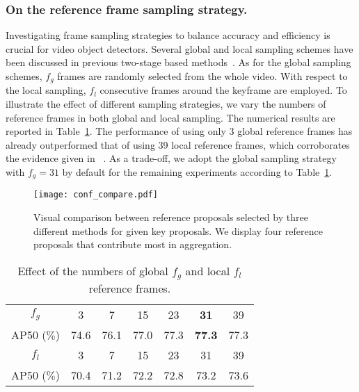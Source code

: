 \documentclass[letterpaper]{article} \usepackage{aaai23}  \usepackage{times}  \usepackage{helvet}  \usepackage{courier}  \usepackage[hyphens]{url}  \usepackage{graphicx} \urlstyle{rm} \def\UrlFont{\rm}  \usepackage{natbib}  \usepackage{caption} \usepackage{xcolor}
\begin{document}
\subsubsection{On the reference frame sampling strategy.} Investigating frame sampling strategies to balance accuracy and efficiency is crucial for video object detectors. Several global and local sampling schemes have been discussed in previous two-stage based methods~\cite{wu2019sequence,gong2021temporal,chen2020memory}. As for the global sampling schemes, $f_g$ frames are randomly selected from the whole video. With respect to the local sampling, $f_l$ consecutive frames around the keyframe are employed. To illustrate the effect of different sampling strategies, we vary the numbers of reference frames in both global and local sampling. The numerical results are reported in Table~\ref{table:effectiveness of local and global number}. The performance of using only 3 global reference frames has already outperformed that of using 39 local reference frames, which corroborates the evidence given in ~\cite{wu2019sequence,gong2021temporal}. As a trade-off, we adopt the global sampling strategy with $f_g= 31$ by default for the remaining experiments according to Table~\ref{table:effectiveness of local and global number}. 

\begin{figure*}[t]
\centering
\texttt{[image: conf\_compare.pdf]}
\caption{Visual comparison between reference proposals selected by three different methods for given key proposals. We display four reference proposals that contribute most in aggregation.}
\vspace{1mm}
\label{fig:conf compare}
\end{figure*}

\setlength{\tabcolsep}{4pt}

\begin{table}[t]
\begin{center}
\begin{tabular}{c|cccccc}
\hline\noalign{\smallskip}
$f_g$ & 3 & 7 & 15 & 23 & \textbf{31} & 39\\
\noalign{\smallskip}
\hline
\noalign{\smallskip}
AP50 ($\%$) & 74.6 & 76.1 & 77.0 & 77.3 & \textbf{77.3} & 77.3 \\
\hline
\hline\noalign{\smallskip}
$f_l$ & 3 & 7 & 15 & 23 & 31 & 39\\
\noalign{\smallskip}
\hline
\noalign{\smallskip}
AP50 ($\%$) & 70.4 & 71.2 & 72.2 & 72.8 & 73.2 & 73.6 \\
\hline
\end{tabular}
\end{center}
\caption{Effect of the numbers of global $f_g$ and local $f_l$ reference frames.}
\label{table:effectiveness of local and global number}
\end{table}
\end{document}
